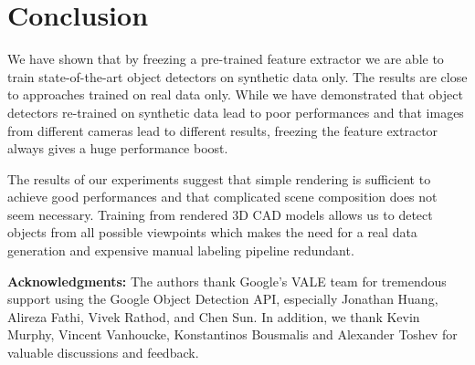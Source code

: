 \documentclass[10pt,twocolumn,letterpaper]{article}
\newcommand{\stefanrmk}[1]{{\color{DarkRed}\bf #1}}
\begin{document}
\section{Conclusion}
\label{sec:conclusions}

We have  shown that by  freezing a pre-trained feature  extractor we are  able to
train state-of-the-art object  detectors  on synthetic  data only.  The results
are close to  approaches trained on real data only.   While we have demonstrated
that  object  detectors   re-trained  on  synthetic  data   lead  to  poor
performances and that  images from different cameras lead  to different results,
freezing the feature extractor always gives a huge performance boost.

The results  of our experiments suggest  that simple rendering is  sufficient to
achieve good performances  and that complicated scene composition  does not seem
necessary.  Training  from rendered 3D  CAD models  allows us to  detect objects
from all possible viewpoints which makes the need for a real data generation and
expensive manual labeling pipeline redundant.

  
\textbf{Acknowledgments:} The authors thank Google's VALE team for tremendous support using the Google Object Detection API, especially Jonathan Huang, Alireza Fathi, Vivek Rathod, and Chen Sun. In addition, we thank Kevin Murphy, Vincent Vanhoucke, Konstantinos Bousmalis and Alexander Toshev for valuable discussions and feedback.


{
\small


}
\end{document}
